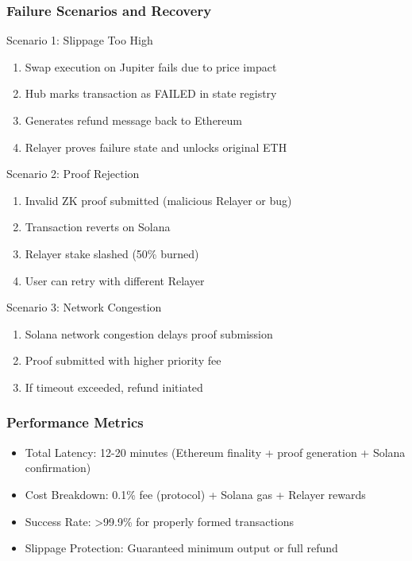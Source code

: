 \documentclass[11pt,a4paper]{article}
\begin{document}
\subsubsection{Failure Scenarios and Recovery}

Scenario 1: Slippage Too High
\begin{enumerate}
    \item Swap execution on Jupiter fails due to price impact
    \item Hub marks transaction as FAILED in state registry
    \item Generates refund message back to Ethereum
    \item Relayer proves failure state and unlocks original ETH
\end{enumerate}

Scenario 2: Proof Rejection
\begin{enumerate}
    \item Invalid ZK proof submitted (malicious Relayer or bug)
    \item Transaction reverts on Solana
    \item Relayer stake slashed (50\% burned)
    \item User can retry with different Relayer
\end{enumerate}

Scenario 3: Network Congestion
\begin{enumerate}
    \item Solana network congestion delays proof submission
    \item Proof submitted with higher priority fee
    \item If timeout exceeded, refund initiated
\end{enumerate}

\subsubsection{Performance Metrics}
\begin{itemize}
    \item Total Latency: 12-20 minutes (Ethereum finality + proof generation + Solana confirmation)
    \item Cost Breakdown: 0.1\% fee (protocol) + Solana gas + Relayer rewards
    \item Success Rate: >99.9\% for properly formed transactions
    \item Slippage Protection: Guaranteed minimum output or full refund
\end{itemize}
\end{document}
